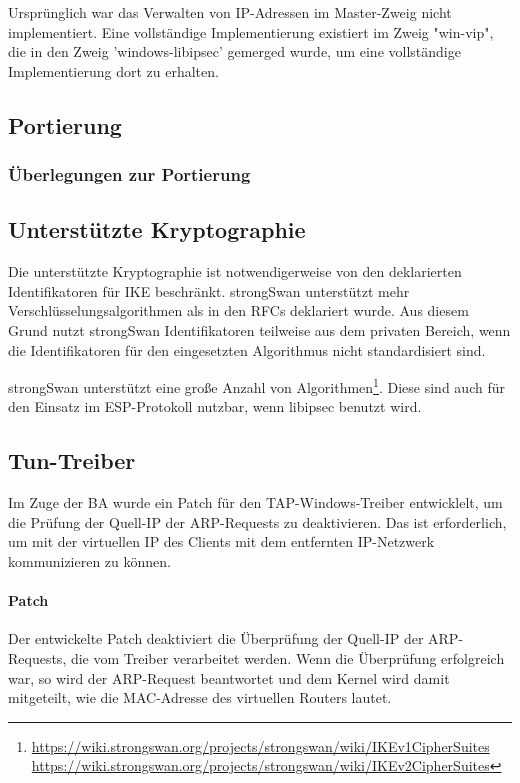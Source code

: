 Ursprünglich war das Verwalten von IP-Adressen im Master-Zweig nicht implementiert.
Eine vollständige Implementierung existiert im Zweig "win-vip", die in den Zweig 'windows-libipsec'
gemerged wurde, um eine vollständige Implementierung dort zu erhalten.

\subsection{Portierung}
\subsubsection{Überlegungen zur Portierung}
\subsection{Unterstützte Kryptographie}
Die unterstützte Kryptographie ist notwendigerweise von den deklarierten Identifikatoren
für IKE beschränkt. strongSwan unterstützt mehr Verschlüsselungsalgorithmen als
in den \acp{RFC} deklariert wurde. Aus diesem Grund nutzt strongSwan Identifikatoren
teilweise aus dem privaten Bereich, wenn die Identifikatoren für den eingesetzten Algorithmus
nicht standardisiert sind.

strongSwan unterstützt eine große Anzahl von Algorithmen\footnote{\url{https://wiki.strongswan.org/projects/strongswan/wiki/IKEv1CipherSuites} \url{https://wiki.strongswan.org/projects/strongswan/wiki/IKEv2CipherSuites}}. Diese sind auch für den Einsatz im ESP-Protokoll nutzbar,
wenn libipsec benutzt wird.
\subsection{Tun-Treiber}
Im Zuge der \ac{BA} wurde ein Patch für den TAP-Windows-Treiber entwicklelt, um die
Prüfung der Quell-IP der ARP-Requests zu deaktivieren. Das ist erforderlich, um mit der
virtuellen IP des Clients mit dem entfernten IP-Netzwerk kommunizieren zu können.

\paragraph{Patch}
Der entwickelte Patch deaktiviert die Überprüfung der Quell-IP der ARP-Requests, die
vom Treiber verarbeitet werden. Wenn die Überprüfung erfolgreich war, so wird der ARP-Request
beantwortet und dem Kernel wird damit mitgeteilt, wie die MAC-Adresse des virtuellen Routers lautet.

